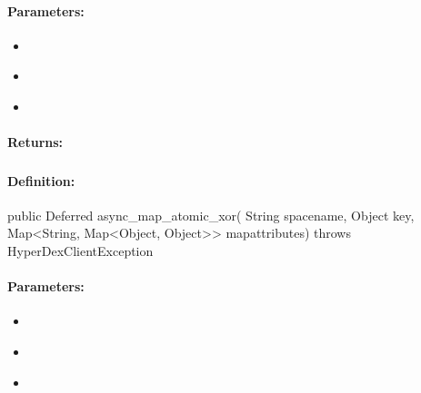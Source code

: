 \paragraph{Parameters:}
\begin{itemize}[noitemsep]
\item {}\\

\item {}\\

\item {}\\

\end{itemize}

\paragraph{Returns:}


\pagebreak
\subsubsection{}
\label{api:java:async_map_atomic_xor}


\paragraph{Definition:}
\begin{javacode}
public Deferred async_map_atomic_xor(
        String spacename,
        Object key,
        Map<String, Map<Object, Object>> mapattributes) throws HyperDexClientException
\end{javacode}

\paragraph{Parameters:}
\begin{itemize}[noitemsep]
\item {}\\

\item {}\\

\item {}\\

\end{itemize}

